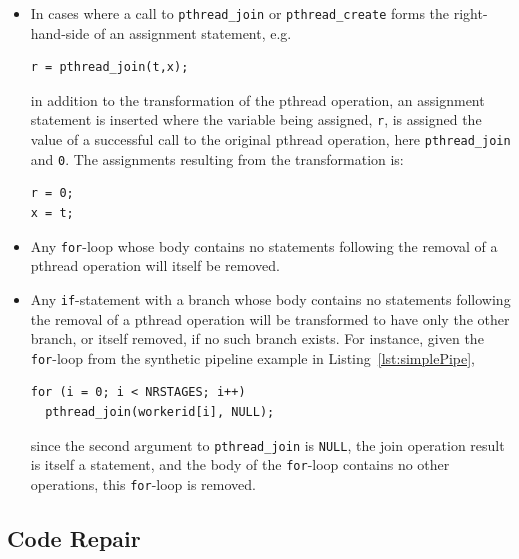 \begin{itemize}
%  
\item In cases where a call to \lstinline|pthread_join| or \lstinline|pthread_create| forms the right-hand-side of an assignment statement, e.g.
%
\begin{lstlisting}
r = pthread_join(t,x);
\end{lstlisting}
%
in addition to the transformation of the pthread operation, an assignment statement is inserted where the variable being assigned, \lstinline|r|, is assigned the value of a successful call to the original pthread operation, here \lstinline|pthread_join| and \lstinline|0|. The assignments resulting from the transformation is:
%
\begin{lstlisting}
r = 0;
x = t;
\end{lstlisting}

 
\item Any \lstinline{for}-loop whose body contains no statements following the removal of a pthread operation will itself be removed.
\item Any \lstinline{if}-statement with a branch whose body contains no statements following the removal of a pthread operation will be transformed to have only the other branch, or itself removed, if no such branch exists. For instance, given the \lstinline{for}-loop from the synthetic pipeline example in Listing~\ref{lst:simplePipe},
%
\begin{lstlisting}[firstnumber=8]
for (i = 0; i < NRSTAGES; i++)
  pthread_join(workerid[i], NULL);
\end{lstlisting}
%
\noindent
since the second argument to \lstinline|pthread_join| is \lstinline|NULL|, the join operation result is itself a statement, and the body of the \lstinline{for}-loop contains no other operations, this \lstinline{for}-loop is removed.
\end{itemize}


\subsection{Code Repair}
\label{sec:refac:repair}

